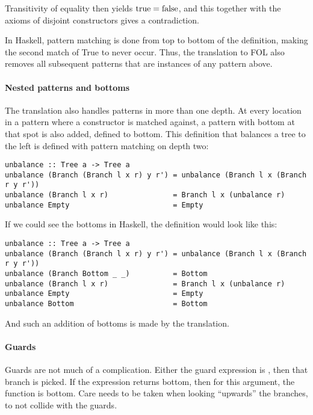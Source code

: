 Transitivity of equality then yields $\mathrm{true} = \mathrm{false}$,
and this together with the axioms of disjoint constructors gives a
contradiction.

In Haskell, pattern matching is done from top to bottom of the
definition, making the second match of True to never occur. Thus, the
translation to FOL also removes all subsequent patterns that are
instances of any pattern above.

\paragraph{Nested patterns and bottoms} The translation also handles patterns in more than one depth. At every
location in a pattern where a constructor is matched against, a
pattern with bottom at that spot is also added, defined to
bottom. This definition that balances a tree to the left is defined
with pattern matching on depth two:

\begin{verbatim}
unbalance :: Tree a -> Tree a
unbalance (Branch (Branch l x r) y r') = unbalance (Branch l x (Branch r y r'))
unbalance (Branch l x r)               = Branch l x (unbalance r)
unbalance Empty                        = Empty
\end{verbatim}

If we could see the bottoms in Haskell, the definition would look like this:

\begin{verbatim}
unbalance :: Tree a -> Tree a
unbalance (Branch (Branch l x r) y r') = unbalance (Branch l x (Branch r y r'))
unbalance (Branch Bottom _ _)          = Bottom
unbalance (Branch l x r)               = Branch l x (unbalance r)
unbalance Empty                        = Empty
unbalance Bottom                       = Bottom
\end{verbatim}

And such an addition of bottoms is made by the translation.

\paragraph{Guards} Guards are not much of a complication. Either the guard expression is
, then that branch is picked. If the expression returns
bottom, then for this argument, the function is bottom. Care needs to
be taken when looking ``upwards'' the branches, to not collide with
the guards.

